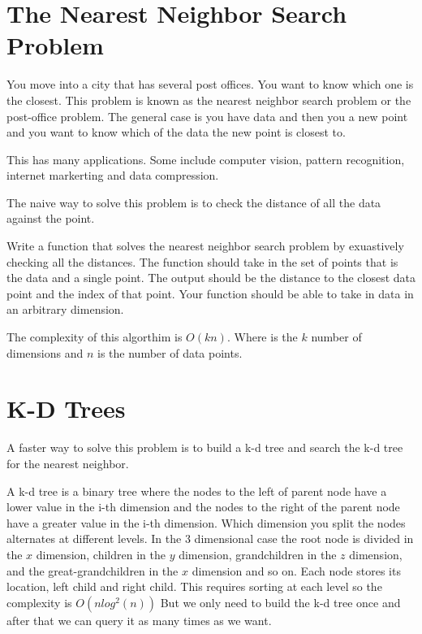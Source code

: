 \label{Ch:NNS}


\section*{The Nearest Neighbor Search Problem}

You move into a city that has several post offices. You want to know which one is the closest. This problem is  known as the nearest neighbor search problem or the post-office problem. The general case is you have data and then you a new point and you want to know which of the data the new point is closest to.

This has many applications. Some include computer vision, pattern recognition, internet markerting and data compression.

The naive way to solve this problem is to check the distance of all the data against the point.

\begin{problem}
Write a function that solves the nearest neighbor search problem by exuastively checking all the distances. The function should take in the set of points that is the data and a single point. The output should be the distance to the closest data point and the index of that point. Your function should be able to take in data in an arbitrary dimension.
\end{problem}

The complexity of this algorthim is $O(kn)$. Where  is the $k$ number of dimensions and $n$ is the number of data points.

\section*{K-D Trees}

A faster way to solve this problem is to build a k-d tree and search the k-d tree for the nearest neighbor. 

A k-d tree is a binary tree where the nodes to the left of parent node have a lower value in the i-th dimension and the nodes to the right of the parent node have a greater value in the i-th dimension. Which dimension you split the nodes alternates at different levels. In the $3$ dimensional case the root node is divided in the $x$ dimension, children in the $y$ dimension, grandchildren in the $z$ dimension, and the great-grandchildren in the $x$ dimension and so on. Each node stores its location, left child and right child. This requires sorting at each level so the complexity is $O(nlog^2(n))$ But we only need to build the k-d tree once and after that we can query it as many times as we want.

